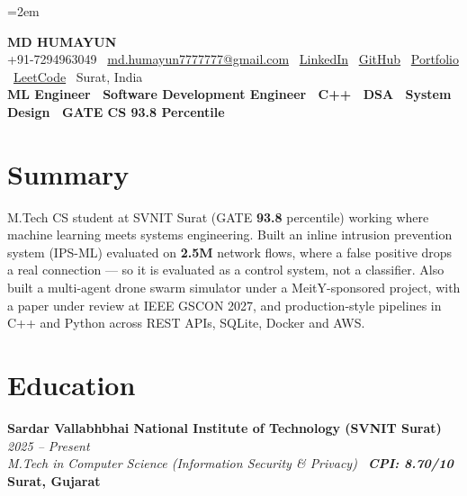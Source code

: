 \documentclass[10pt, legalpaper]{article}
\newcommand{\eduentry}[4]{%
    \noindent\textbf{#1} \hfill \textit{\color{medgray}#2}\\[1pt]
    \noindent\textit{\color{darkgray}#3} \hfill \textbf{#4}\\[2pt]
}
\begin{document}
\raggedbottom
{}
\emergencystretch=2em
\pagestyle{empty}

\begin{center}
{\LARGE\bfseries MD HUMAYUN}\\[2pt]
{\small
+91-7294963049 \textbar\
\href{mailto:md.humayun7777777@gmail.com}{md.humayun7777777@gmail.com} \textbar\
\href{https://www.linkedin.com/in/md-humayun-82051521a/}{LinkedIn} \textbar\
\href{https://github.com/mdhumayun7}{GitHub} \textbar\
\href{https://mdhumayun7.github.io/MD-HUMAYUN-PORTFOLIO/}{Portfolio} \textbar\
\href{https://leetcode.com/u/mdhumayun7/}{LeetCode} \textbar\
Surat, India
}\\[3pt]
{\small\textbf{ML Engineer \textbar\ Software Development Engineer \textbar\ C++ \textbar\ DSA \textbar\ System Design \textbar\ GATE CS 93.8 Percentile}}
\end{center}

\vspace{-2pt}

\section{Summary}

{\small
M.Tech CS student at SVNIT Surat (GATE \textbf{93.8} percentile) working where machine learning meets systems engineering. Built an inline intrusion prevention system (IPS-ML) evaluated on \textbf{2.5M} network flows, where a false positive drops a real connection --- so it is evaluated as a control system, not a classifier. Also built a multi-agent drone swarm simulator under a MeitY-sponsored project, with a paper under review at IEEE GSCON 2027, and production-style pipelines in C++ and Python across REST APIs, SQLite, Docker and AWS.
}

\section{Education}

\eduentry
{Sardar Vallabhbhai National Institute of Technology (SVNIT Surat)}
{2025 -- Present}
{M.Tech in Computer Science (Information Security \& Privacy) \textbar\ \textbf{CPI: 8.70/10}}
{Surat, Gujarat}
\end{document}
